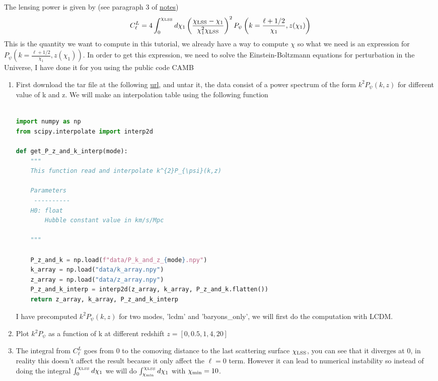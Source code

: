 \documentclass[a4paper, 11pt]{article}
\def\ba{\begin{eqnarray}}
\def\ea{\end{eqnarray}}
\begin{document}
The lensing power is given by   (see paragraph 3 of \href{https://github.com/thibautlouis/thibautlouis.github.io/blob/master/derivation.pdf}{notes})
\ba
C^{L}_{\ell} =  4  \int^{\chi_{\rm LSS}}_{0}  d\chi_{1}  \left(\frac{\chi_{\rm LSS} - \chi_{1}}{\chi^{2}_{1}\chi_{\rm LSS} } \right)^{2}  P_{\psi} \left(k = \frac{\ell + 1/2}{\chi_{1}}, z(\chi_{1}) \right) 
\ea
This is the quantity we want to compute in this tutorial, we already have a way to compute $\chi$ so what we need is an expression for $P_{\psi} \left(k = \frac{\ell + 1/2}{\chi_{1}}, z(\chi_{1}) \right) $.
In order to get this expression, we need to solve the Einstein-Boltzmann equations for perturbation in the Universe, I have done it for you using the public code CAMB




\begin{enumerate}
\item First download the tar file at the following \href{https://github.com/thibautlouis/TD_ED_Phoeenix/blob/main/data.tar.gz}{url}, and untar it, the data consist of a power spectrum of the form $k^{2}P_{\psi}(k,z)$ for different value of k and z.
We will make an interpolation table using the following function  \\ \\
 \begin{lstlisting}[language=Python]
import numpy as np
from scipy.interpolate import interp2d

def get_P_z_and_k_interp(mode):
    """
    This function read and interpolate k^{2}P_{\psi}(k,z)
    
    Parameters
     ----------
    H0: float
        Hubble constant value in km/s/Mpc

    """

    P_z_and_k = np.load(f"data/P_k_and_z_{mode}.npy")
    k_array = np.load("data/k_array.npy")
    z_array = np.load("data/z_array.npy")
    P_z_and_k_interp = interp2d(z_array, k_array, P_z_and_k.flatten())
    return z_array, k_array, P_z_and_k_interp

\end{lstlisting}
I have precomputed $k^{2}P_{\psi}(k,z)$   for two modes, 'lcdm' and 'baryons\_only', we will first do the computation with LCDM.
\item Plot $k^{2}P_{\psi}$  as a function of k at different redshift $z = [0, 0.5, 1, 4 ,20]$
\item   The integral from $C^{L}_{\ell} $ goes from 0 to the comoving distance to the last scattering surface $\chi_{\rm LSS}$, you can see that it diverges at 0, in reality this doesn't affect the result because it only affect the $\ell =0$ term. However it can lead to numerical instability so instead of doing the integral  $\int^{\chi_{\rm LSS}}_{0}  d\chi_{1}$ we will do $\int^{\chi_{\rm LSS}}_{\chi_{\rm min}}  d\chi_{1}$ with $\chi_{\rm min}=10$.


\end{enumerate}
\end{document}
